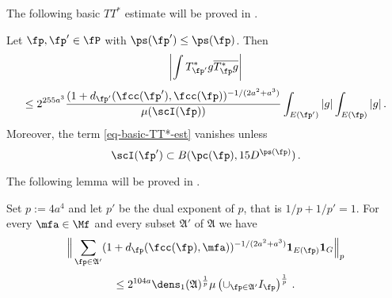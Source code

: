 The following basic $TT^*$ estimate will be proved in .
\begin{lemma}
    \label{tile-correlation}
    \leanok
    Let $\fp, \fp'\in \fP$ with
    $\ps({\fp'})\leq \ps({\fp})$.
    Then
    \begin{equation}
        \label{eq-basic-TT*-est}
        \left|\int T^*_{\fp'}g\overline{T^*_{\fp}g}\right|
    \end{equation}
    \begin{equation}
        \le 2^{255a^3}\frac{(1+d_{\fp'}(\fcc(\fp'), \fcc(\fp))^{-1/(2a^2+a^3)}}{\mu(\scI(\fp))}\int_{E(\fp')}|g|\int_{E(\fp)}|g|\,.
    \end{equation}
    Moreover, the term \eqref{eq-basic-TT*-est} vanishes unless
    \begin{equation}
        \scI(\fp') \subset B(\pc(\fp), 15D^{\ps(\fp)})\, .
    \end{equation}
\end{lemma}

The following lemma will be proved in .
\begin{lemma}
    \label{antichain-tile-count}
\leanok
{}
    Set $p:=4a^4$ and let $p'$ be the dual exponent of $p$, that is $1/p+1/p'=1$.
    For every $\mfa\in\Mf$ and every subset $\mathfrak{A}'$ of $\mathfrak{A}$ we have
    \begin{equation}
        \label{eq-antichain-Lp}
        \Big\|\sum_{\fp\in\mathfrak{A}'}(1+d_{\fp}(\fcc(\fp), \mfa))^{-1/(2a^2+a^3)}\mathbf{1}_{E(\fp)}\mathbf{1}_G\Big\|_{p}
    \end{equation}
    \begin{equation}
        \le
        2^{104a}\dens_1(\mathfrak{A})^{\frac 1p}\mu\left(\cup_{\fp\in\mathfrak{A}'}I_{\fp}\right)^{\frac 1p}\, .
    \end{equation}
\end{lemma}

